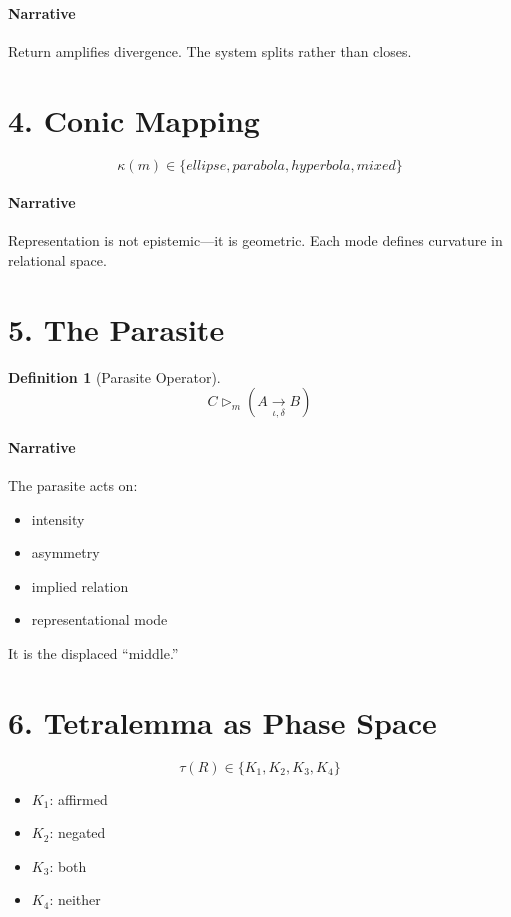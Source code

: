 \documentclass[11pt]{article}
\newtheorem{definition}{Definition}
\begin{document}
\paragraph{Narrative}
Return amplifies divergence.
The system splits rather than closes.

\section{4. Conic Mapping}
\[
\kappa(m) \in \{ellipse, parabola, hyperbola, mixed\}
\]

\paragraph{Narrative}
Representation is not epistemic—it is geometric.
Each mode defines curvature in relational space.

\section{5. The Parasite}
\begin{definition}[Parasite Operator]
\[
C \triangleright_m (A \xrightarrow[\iota,\delta]{} B)
\]
\end{definition}

\paragraph{Narrative}
The parasite acts on:
\begin{itemize}
\item intensity
\item asymmetry
\item implied relation
\item representational mode
\end{itemize}

It is the displaced “middle.”

\section{6. Tetralemma as Phase Space}
\[
\tau(R) \in \{K_1, K_2, K_3, K_4\}
\]

\begin{itemize}
\item $K_1$: affirmed
\item $K_2$: negated
\item $K_3$: both
\item $K_4$: neither
\end{itemize}
\end{document}

